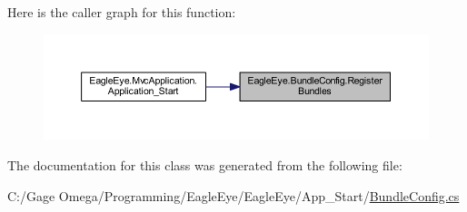 Here is the caller graph for this function\+:\nopagebreak
\begin{figure}[H]
\begin{center}
\leavevmode
\includegraphics[width=350pt]{class_eagle_eye_1_1_bundle_config_a4ce4ae5f3885f62a66a8b7d85c756143_icgraph}
\end{center}
\end{figure}


The documentation for this class was generated from the following file\+:\begin{DoxyCompactItemize}
\item 
C\+:/\+Gage Omega/\+Programming/\+Eagle\+Eye/\+Eagle\+Eye/\+App\+\_\+\+Start/\mbox{\hyperlink{_bundle_config_8cs}{Bundle\+Config.\+cs}}\end{DoxyCompactItemize}

